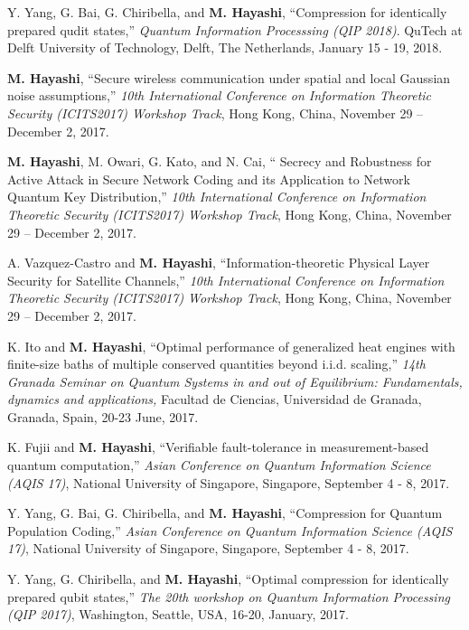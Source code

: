 \documentclass[a4paper,12pt,oneside]{article}
\begin{document}
\begin{enumerate}
Y. Yang, G. Bai, G. Chiribella, and \textbf{M. Hayashi}, 
``Compression for identically prepared qudit states,'' 
{\em Quantum Information Processsing (QIP 2018)}.
QuTech at Delft University of Technology, Delft, The Netherlands,
January 15 - 19, 2018.

\textbf{M. Hayashi},
``Secure wireless communication under spatial and local Gaussian noise assumptions,''
{\em 10th International Conference on Information Theoretic Security (ICITS2017) Workshop Track}, 
Hong Kong, China, November 29  -- December 2, 2017.


\textbf{M. Hayashi}, M. Owari, G. Kato, and N. Cai,
`` Secrecy and Robustness for Active Attack in Secure Network Coding and its Application to  Network Quantum Key Distribution,''
{\em 10th International Conference on Information Theoretic Security (ICITS2017) Workshop Track}, 
Hong Kong, China, November 29  -- December 2, 2017.


A. Vazquez-Castro and \textbf{M. Hayashi},
``Information-theoretic Physical Layer Security for Satellite Channels,''
{\em 10th International Conference on Information Theoretic Security (ICITS2017) Workshop Track}, 
Hong Kong, China, November 29  -- December 2, 2017.

K. Ito and \textbf{M. Hayashi}, 
``Optimal performance of generalized heat engines with finite-size baths of multiple conserved quantities beyond i.i.d. scaling,'' 
{\em 14th Granada Seminar on Quantum Systems
in and out of Equilibrium: Fundamentals, dynamics and applications,} 
Facultad de Ciencias, Universidad de Granada, Granada, Spain, 20-23 June, 2017.

K. Fujii and \textbf{M. Hayashi}, ``Verifiable fault-tolerance in measurement-based quantum computation,'' 
{\em Asian Conference on Quantum Information Science (AQIS 17)}, 
National University of Singapore, Singapore, September 4 - 8, 2017.

Y. Yang, G. Bai, G. Chiribella, and \textbf{M. Hayashi}, ``Compression for Quantum Population Coding,'' 
{\em Asian Conference on Quantum Information Science (AQIS 17)}, 
National University of Singapore, Singapore, September 4 - 8, 2017.

Y. Yang, G. Chiribella, and \textbf{M. Hayashi}, ``Optimal compression for identically prepared qubit states,'' 
{\em The 20th workshop on Quantum Information Processing (QIP 2017)}, 
Washington, Seattle, USA, 16-20, January, 2017.


\end{enumerate}
\end{document}
